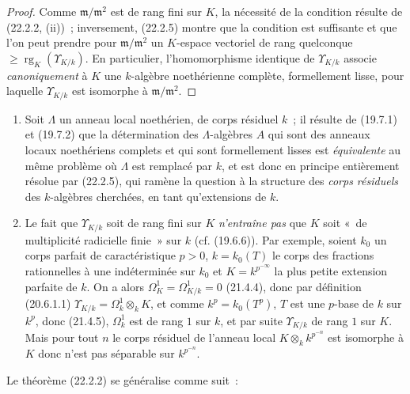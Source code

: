 \begin{proof}
Comme $\mathfrak m/\mathfrak m^2$ est de rang fini sur $K$, la nécessité de
la condition résulte de (22.2.2, (ii))~; inversement, (22.2.5) montre que la
condition est suffisante et que l'on peut prendre pour
$\mathfrak m/\mathfrak m^2$ un $K$-espace vectoriel de rang quelconque
$\geqslant\operatorname{rg}_K(\Upsilon_{K/k})$.
En particulier, l'homomorphisme identique de $\Upsilon_{K/k}$ associe
\emph{canoniquement} à $K$ une $k$-algèbre noethérienne complète,
formellement lisse, pour laquelle $\Upsilon_{K/k}$ est isomorphe à
$\mathfrak m/\mathfrak m^2$.
\end{proof}

\begin{remarks}[22.2.7]
\label{0.22.2.7-fr}
\begin{enumerate}
  \item[(i)] Soit $\Lambda$ un anneau local noethérien, de corps résiduel
  $k$~; il résulte de (19.7.1) et (19.7.2) que la détermination des
  $\Lambda$-algèbres $A$ qui sont des anneaux locaux noethériens complets et
  qui sont formellement lisses est \emph{équivalente} au même problème où
  $\Lambda$ est remplacé par $k$, et est donc en principe entièrement
  résolue par (22.2.5), qui ramène la question à la structure des \emph{corps
  résiduels} des $k$-algèbres cherchées, en tant qu'extensions de $k$.

  \item[(ii)] Le fait que $\Upsilon_{K/k}$ soit de rang fini sur $K$
  \emph{n'entraîne pas} que $K$ soit «~de multiplicité radicielle finie~» sur
  $k$ (cf. (19.6.6)). Par exemple, soient $k_0$ un corps parfait de
  caractéristique $p>0$, $k=k_0(T)$ le corps des fractions rationnelles à une
  indéterminée sur $k_0$ et $K=k^{p^{-\infty}}$ la plus petite extension
  parfaite de $k$. On a alors $\Omega^1_K=\Omega^1_{K/k}=0$ (21.4.4), donc
  par définition (20.6.1.1)
  $\Upsilon_{K/k}=\Omega^1_k\otimes_kK$, et comme $k^p=k_0(T^p)$, $T$ est
  une $p$-base de $k$ sur $k^p$, donc (21.4.5), $\Omega^1_k$ est de rang $1$
  sur $k$, et par suite $\Upsilon_{K/k}$ de rang $1$ sur $K$. Mais pour tout
  $n$ le corps résiduel de l'anneau local $K\otimes_kk^{p^{-n}}$ est
  isomorphe à $K$ donc n'est pas séparable sur $k^{p^{-n}}$.
\end{enumerate}
\end{remarks}

Le théorème (22.2.2) se généralise comme suit~:


